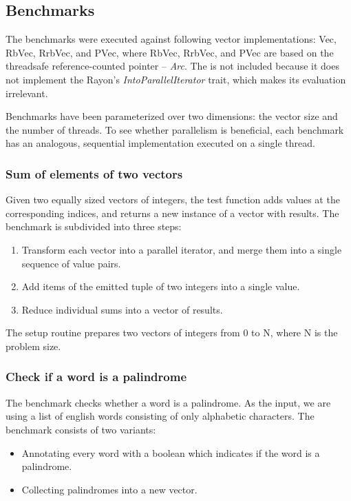 

\subsection{Benchmarks}
The benchmarks were executed against following vector implementations: Vec, RbVec, RrbVec, and PVec, where RbVec, RrbVec, and PVec are based on the threadsafe reference-counted pointer -- \emph{Arc}. The \imrsvec{} is not included because it does not implement the Rayon's \emph{IntoParallelIterator} trait, which makes its evaluation irrelevant. 

Benchmarks have been parameterized over two dimensions: the vector size and the number of threads. To see whether parallelism is beneficial, each benchmark has an analogous, sequential implementation executed on a single thread. 

\subsubsection*{Sum of elements of two vectors}
Given two equally sized vectors of integers, the test function adds values at the corresponding indices, and returns a new instance of a vector with results. The benchmark is subdivided into three steps:

\begin{enumerate}
    \item Transform each vector into a parallel iterator, and merge them into a single sequence of value pairs. 
    \item Add items of the emitted tuple of two integers into a single value.
    \item Reduce individual sums into a vector of results.
\end{enumerate}

The setup routine prepares two vectors of integers from 0 to N, where N is the problem size. 

\subsubsection*{Check if a word is a palindrome}
The benchmark checks whether a word is a palindrome. As the input, we are using a list of english words consisting of only alphabetic characters. The benchmark consists of two variants:
\begin{itemize}
    \item Annotating every word with a boolean which indicates if the word is a palindrome. 
    \item Collecting palindromes into a new vector. 
\end{itemize}

